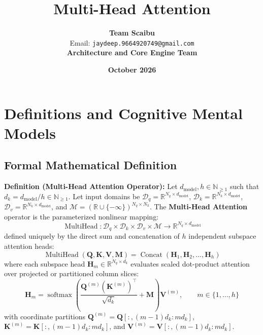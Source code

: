 \documentclass[11pt,a4paper]{article}
\title{\textbf{Multi-Head Attention}}
\author{\textbf{Team Scaibu} \\ \small Email: \texttt{jaydeep.9664920749@gmail.com} \\ \small \textbf{Architecture and Core Engine Team}}
\date{\textbf{October 2026}}
\theoremstyle{definition}
\begin{document}
\maketitle

\section{Definitions and Cognitive Mental Models}

\subsection{Formal Mathematical Definition}
\textbf{Definition (Multi-Head Attention Operator):}
Let $d_{\text{model}}, h \in \mathbb{N}_{\ge 1}$ such that $d_k = d_{\text{model}} / h \in \mathbb{N}_{\ge 1}$. Let input domains be $\boldsymbol{\mathcal{D}}_q = \mathbb{R}^{N_q \times d_{\text{model}}}$, $\boldsymbol{\mathcal{D}}_k = \mathbb{R}^{N_k \times d_{\text{model}}}$, $\boldsymbol{\mathcal{D}}_v = \mathbb{R}^{N_k \times d_{\text{model}}}$, and $\boldsymbol{\mathcal{M}} = (\mathbb{R} \cup \{-\infty\})^{N_q \times N_k}$.
The \textbf{Multi-Head Attention} operator is the parameterized nonlinear mapping:
{\boldmath
\begin{equation}
\operatorname{MultiHead}: \boldsymbol{\mathcal{D}}_q \times \boldsymbol{\mathcal{D}}_k \times \boldsymbol{\mathcal{D}}_v \times \boldsymbol{\mathcal{M}} \longrightarrow \mathbb{R}^{N_q \times d_{\text{model}}}
\end{equation}
}
defined uniquely by the direct sum and concatenation of $h$ independent subspace attention heads:
{\boldmath
\begin{equation}
\operatorname{MultiHead}(\mathbf{Q}, \mathbf{K}, \mathbf{V}, \mathbf{M}) = \operatorname{Concat}\left(\mathbf{H}_1, \mathbf{H}_2, \dots, \mathbf{H}_h\right)
\end{equation}
}
where each subspace head $\mathbf{H}_m \in \mathbb{R}^{N_q \times d_k}$ evaluates scaled dot-product attention over projected or partitioned column slices:
{\boldmath
\begin{equation}
\mathbf{H}_m = \operatorname{softmax}\left(\frac{\mathbf{Q}^{(m)}(\mathbf{K}^{(m)})^\top}{\sqrt{d_k}} + \mathbf{M}\right)\mathbf{V}^{(m)}, \qquad m \in \{1, \dots, h\}
\end{equation}
}
with coordinate partitions $\mathbf{Q}^{(m)} = \mathbf{Q}[:, (m-1)d_k : m d_k]$, $\mathbf{K}^{(m)} = \mathbf{K}[:, (m-1)d_k : m d_k]$, and $\mathbf{V}^{(m)} = \mathbf{V}[:, (m-1)d_k : m d_k]$.
\end{document}
